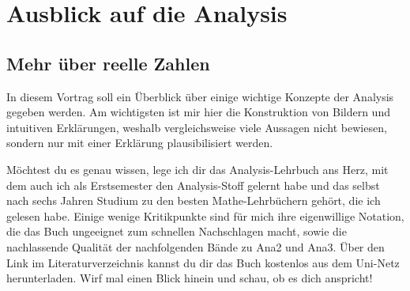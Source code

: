 



\chapter{Ausblick auf die Analysis}


\section{Mehr über reelle Zahlen}


\begin{bem}[Buchtipp]
    In diesem Vortrag soll ein Überblick über einige wichtige Konzepte der Analysis gegeben werden. Am wichtigsten ist mir hier die Konstruktion von Bildern und intuitiven Erklärungen, weshalb vergleichsweise viele Aussagen nicht bewiesen, sondern nur mit einer Erklärung plausibilisiert werden.
    
    Möchtest du es genau wissen, lege ich dir das Analysis-Lehrbuch \cite{AE06} ans Herz, mit dem auch ich als Erstsemester den Analysis-Stoff gelernt habe und das selbst nach sechs Jahren Studium zu den besten Mathe-Lehrbüchern gehört, die ich gelesen habe. Einige wenige Kritikpunkte sind für mich ihre eigenwillige Notation, die das Buch ungeeignet zum schnellen Nachschlagen macht, sowie die nachlassende Qualität der nachfolgenden Bände zu Ana2 und Ana3. Über den Link im Literaturverzeichnis kannst du dir das Buch kostenlos aus dem Uni-Netz herunterladen. Wirf mal einen Blick hinein und schau, ob es dich anspricht!
\end{bem}


